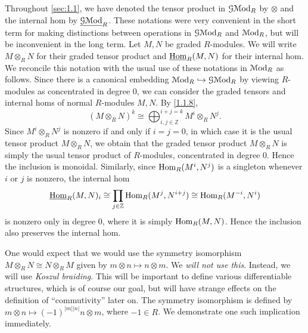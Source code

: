 \begin{notation}\label{1.1.12}
	Throughout \cref{sec:1.1}, we have denoted the tensor product in $\mathcal{G} \mathcal{M}\mathrm{od} _R$ by $\otimes $ and the internal hom by $\underline{\mathcal{G} \mathcal{M}\mathrm{od}}_R$. These notations were very convenient in the short term for making distinctions between operations in $\mathcal{G} \mathcal{M}\mathrm{od} _R$ and $\mathcal{M}\mathrm{od} _R$, but will be inconvenient in the long term. Let $M,N$ be graded $R$-modules. We will write $M\otimes _RN$ for their graded tensor product and $\underline{\operatorname{Hom}}_R(M,N)$ for their internal hom. We reconcile this notation with the usual use of these notations in $\mathcal{M}\mathrm{od}_R$ as follows. Since there is a canonical embedding $\mathcal{M}\mathrm{od} _R\hookrightarrow \mathcal{G} \mathcal{M}\mathrm{od} _R$ by viewing $R$-modules as concentrated in degree 0, we can consider the graded tensors and internal homs of normal $R$-modules $M,N$. By \cref{1.1.8},
	\[
		(M\otimes _RN)^k \cong \bigoplus_{i,j\in\mathbb{Z} }^{i+j=k} M^i\otimes _RN^j
	.\]
	Since $M^i \otimes_RN^j $ is nonzero if and only if $i=j=0$, in which case it is the usual tensor product $M\otimes _RN$, we obtain that the graded tensor product $M\otimes _RN$ is simply the usual tensor product of $R$-modules, concentrated in degree 0. Hence the inclusion is monoidal. Similarly, since $\operatorname{Hom}_R(M^i, N^j) $ is a singleton whenever $i$ or $j$ is nonzero, the internal hom
	\[
		\underline{\operatorname{Hom}}_R(M,N)_i \cong \prod_{j\in\mathbb{Z} } \operatorname{Hom}_R(M^j, N^{i+j} ) \cong \operatorname{Hom}_R(M^{-i} , N^i) 	
	\]
	is nonzero only in degree 0, where it is simply $\operatorname{Hom}_R(M, N) $. Hence the inclusion also preserves the internal hom.
\end{notation}

\begin{warning}\label{1.1.13}
	One would expect that we would use the symmetry isomorphism $M\otimes _RN \cong N\otimes _RM$ given by $m\otimes n\mapsto n\otimes m$. We \emph{will not use this}. Instead, we will use \emph{Koszul braiding}. This will be important to define various differentiable structures, which is of course our goal, but will have strange effects on the definition of ``commutivity'' later on. The symmetry isomorphism is defined by $m\otimes n\mapsto (-1)^{\left| m \right| \left| n \right| } n\otimes m$, where $-1\in R$. We demonstrate one such implication immediately.
\end{warning}

